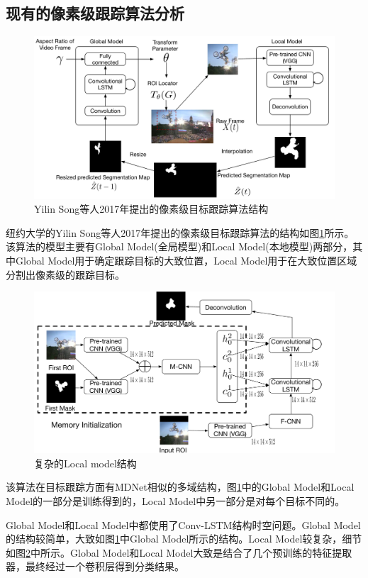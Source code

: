 \subsection{现有的像素级跟踪算法分析} \label{section:pixel_wise_vot_2017_intro}
\begin{figure}[htbp!]
    \centering
    \includegraphics[width = 1.\textwidth]{chap/img/Tracking_framework.pdf}
    \caption{Yilin Song等人2017年提出的像素级目标跟踪算法结构\supercite{DBLP:journals/corr/abs-1711-07377}}
    \label{fig:pixel_level_vot_2017}
\end{figure}
\par
纽约大学的Yilin Song等人2017年提出的像素级目标跟踪算法的结构如图\ref{fig:pixel_level_vot_2017}所示。该算法的模型主要有Global Model(全局模型)和Local Model(本地模型)两部分，其中Global Model用于确定跟踪目标的大致位置，Local Model用于在大致位置区域分割出像素级的跟踪目标。
\par
\begin{figure}[htbp!]
    \centering
    \includegraphics[width = 1.\textwidth]{chap/img/Local.pdf}
    \caption{复杂的Local model结构\supercite{DBLP:journals/corr/abs-1711-07377}}
    \label{fig:local_model}
\end{figure}
\par
该算法在目标跟踪方面有MDNet相似的多域结构，图\ref{fig:pixel_level_vot_2017}中的Global Model和Local Model的一部分是训练得到的，Local Model中另一部分是对每个目标不同的。
\par
Global Model和Local Model中都使用了Conv-LSTM结构时空问题。Global Model的结构较简单，大致如图\ref{fig:pixel_level_vot_2017}中Global Model所示的结构。Local Model较复杂，细节如图\ref{fig:local_model}中所示。Global Model和Local Model大致是结合了几个预训练的特征提取器，最终经过一个卷积层得到分类结果。

